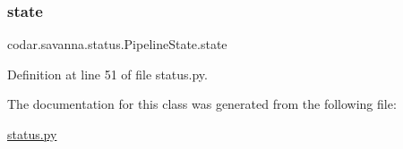 \subsubsection{\texorpdfstring{state}{state}}
{\footnotesize\ttfamily codar.\+savanna.\+status.\+Pipeline\+State.\+state}



Definition at line 51 of file status.\+py.



The documentation for this class was generated from the following file\+:\begin{DoxyCompactItemize}
\item 
\hyperlink{status_8py}{status.\+py}\end{DoxyCompactItemize}

